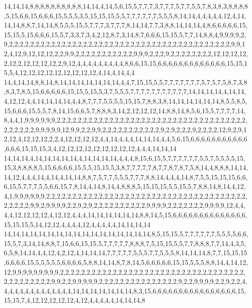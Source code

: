 14,14,14,8,8,8,8,8,8,8,8,8,8,14,14,4,14,5,6,15,5,7,7,7,3,7,7,7,5,7,7,5,5,7,8,3,8,3,8,8,8,8,5,15,6,6,15,6,6,6,15,5,5,5,3,5,15,15,15,5,5,7,7,7,7,7,7,5,5,5,8,14,14,4,4,4,4,4,12,4,14,14,14,8,8,7,14,14,8,5,5,5,15,5,7,7,7,3,7,7,7,8,14,14,7,7,3,8,8,14,14,14,4,8,6,6,6,6,6,15,15,15,5,15,6,6,6,15,5,7,3,3,7,3,4,2,12,8,7,3,14,8,7,6,6,6,15,15,5,7,7,14,8,8,4,9,9,9,9,2,9,2,2,2,2,2,2,2,2,2,2,2,2,2,2,2,2,2,2,2,2,2,2,2,2,2,2,2,2,2,2,2,2,2,2,2,2,2,2,2,2,2,2,9,9,12,4,12,9,12,12,12,2,2,9,9,2,2,2,2,2,2,2,2,2,2,2,9,9,9,2,2,2,9,2,2,2,2,2,2,2,2,12,12,12,12,2,12,2,12,12,12,12,2,9,12,4,4,4,4,4,4,4,4,4,8,6,6,15,15,6,6,6,6,6,6,6,6,6,6,6,6,6,15,15,15,5,4,12,12,12,12,12,12,12,12,12,4,14,4,14,4,4
14,4,14,14,8,8,14,8,14,14,14,14,14,14,14,4,4,7,15,15,5,5,7,7,7,7,7,7,7,5,7,5,7,5,8,7,3,8,8,3,7,8,5,15,6,6,6,6,6,15,15,5,15,5,3,7,5,5,5,7,7,7,7,7,7,7,7,7,7,7,14,14,14,14,4,14,14,4,12,12,4,4,14,14,14,14,4,4,8,7,7,7,5,5,5,5,15,15,7,8,8,3,8,14,14,14,14,14,14,8,5,5,8,5,15,6,6,6,15,5,5,7,8,14,15,6,6,5,7,8,8,8,3,14,2,12,12,12,14,8,8,14,8,5,6,15,5,7,7,7,7,14,8,4,4,1,9,9,9,9,9,9,2,2,2,2,2,2,2,2,2,2,2,2,2,2,2,2,2,2,2,2,2,2,2,2,2,2,2,2,2,2,2,2,2,2,2,2,2,2,2,2,2,2,9,9,9,9,9,12,9,9,2,2,9,9,2,2,2,2,2,2,2,2,2,2,2,9,2,9,2,2,2,9,2,2,2,2,12,9,2,9,12,12,4,12,12,12,2,2,4,12,12,12,12,4,4,14,4,4,4,14,14,14,4,4,5,6,15,6,6,6,6,6,6,6,6,6,6,6,6,6,6,15,15,15,3,4,12,12,12,12,12,12,12,12,12,4,4,4,14,14,14
14,14,14,4,14,14,14,14,14,4,14,14,14,14,4,4,4,8,15,6,15,5,7,7,7,7,7,7,5,5,7,5,5,5,5,15,15,3,8,8,8,8,5,15,6,6,6,6,15,5,5,15,15,5,3,8,7,7,7,7,7,8,7,7,8,7,8,7,5,8,14,4,8,8,8,14,14,14,12,4,4,4,14,4,14,4,14,14,8,8,7,5,7,7,5,5,5,7,7,7,8,8,14,4,4,4,14,8,7,5,5,15,15,15,6,6,6,15,5,7,7,7,5,5,6,6,15,7,8,14,4,14,8,14,4,8,8,8,5,15,15,15,5,5,15,5,7,8,8,14,8,14,4,12,4,1,9,9,9,9,9,9,2,2,2,2,2,2,2,2,2,2,2,2,2,2,2,2,2,2,2,2,2,2,2,2,2,2,2,2,2,2,2,2,2,2,2,2,2,2,2,2,2,2,2,9,9,2,9,9,9,9,2,2,9,2,9,2,2,2,2,2,2,2,2,2,2,9,9,9,9,2,2,2,2,2,2,2,9,9,9,9,12,4,4,4,4,12,12,12,12,4,12,12,4,4,4,14,14,14,14,14,14,8,8,14,5,15,6,6,6,6,6,6,6,6,6,6,6,6,6,6,15,15,15,5,14,12,12,4,4,4,4,12,4,4,4,4,4,14,14,14,14
14,14,14,14,14,14,14,14,14,14,14,14,14,14,14,14,14,8,5,15,15,5,7,7,7,7,7,7,5,5,5,5,6,6,15,5,7,3,14,14,8,8,7,15,6,6,15,15,5,7,7,7,7,7,8,8,8,7,5,15,15,5,5,7,7,8,8,8,7,7,14,4,3,5,6,5,8,14,14,4,4,12,4,2,12,4,14,14,14,7,7,7,7,7,5,5,5,7,7,5,5,5,8,14,14,14,8,7,7,15,15,15,6,6,6,6,15,5,5,5,5,5,6,6,6,6,5,8,8,14,14,8,7,8,14,5,6,6,6,6,6,15,15,5,5,5,8,8,14,4,14,12,12,9,9,9,9,9,9,9,9,9,2,2,2,2,2,2,2,2,2,2,2,2,2,2,2,2,2,2,2,2,2,2,2,2,2,2,2,2,2,2,2,2,2,2,2,2,2,2,2,2,2,2,2,2,9,9,2,2,9,9,9,9,9,2,2,2,2,2,2,2,2,2,2,2,2,2,2,2,9,2,2,9,9,9,9,2,2,9,2,2,4,4,4,4,4,4,4,4,4,4,4,4,4,4,14,14,14,14,14,14,14,8,3,15,6,6,6,6,6,6,6,6,6,6,6,6,6,6,6,6,15,15,15,7,4,12,12,12,12,12,4,12,4,4,4,4,4,14,14,14,8
